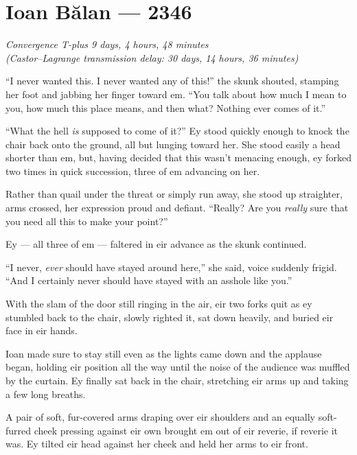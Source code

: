 \hypertarget{ioan-bux103lan-2346}{%
\chapter{Ioan Bălan — 2346}\label{ioan-bux103lan-2346}}

\begin{center}
\emph{Convergence T-plus 9 days, 4 hours, 48 minutes}\\
\emph{(Castor--Lagrange transmission delay: 30 days, 14 hours, 36 minutes)}
\end{center}

\noindent ``I never wanted this. I never wanted any of this!'' the skunk shouted, stamping her foot and jabbing her finger toward em. ``You talk about how much I mean to you, how much this place means, and then what? Nothing ever comes of it.''

``What the hell \emph{is} supposed to come of it?'' Ey stood quickly enough to knock the chair back onto the ground, all but lunging toward her. She stood easily a head shorter than em, but, having decided that this wasn't menacing enough, ey forked two times in quick succession, three of em advancing on her.

Rather than quail under the threat or simply run away, she stood up straighter, arms crossed, her expression proud and defiant. ``Really? Are you \emph{really} sure that you need all this to make your point?''

Ey — all three of em — faltered in eir advance as the skunk continued.

``I never, \emph{ever} should have stayed around here,'' she said, voice suddenly frigid. ``And I certainly never should have stayed with an asshole like you.''

With the slam of the door still ringing in the air, eir two forks quit as ey stumbled back to the chair, slowly righted it, sat down heavily, and buried eir face in eir hands.

Ioan made sure to stay still even as the lights came down and the applause began, holding eir position all the way until the noise of the audience was muffled by the curtain. Ey finally sat back in the chair, stretching eir arms up and taking a few long breaths.

A pair of soft, fur-covered arms draping over eir shoulders and an equally soft-furred cheek pressing against eir own brought em out of eir reverie, if reverie it was. Ey tilted eir head against her cheek and held her arms to eir front.

